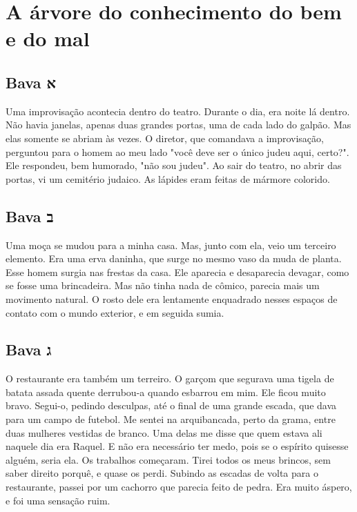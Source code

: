 \part{A árvore do conhecimento do bem e do mal}

\chapter*{Bava א\smallskip{}}

Uma improvisação acontecia dentro do teatro. Durante o dia, era noite lá dentro. Não havia janelas, apenas duas grandes portas, uma de cada lado do galpão. Mas elas somente se abriam às vezes. O diretor, que comandava a improvisação, perguntou para o homem ao meu lado "você deve ser o único judeu aqui, certo?". Ele respondeu, bem humorado, "não sou judeu". Ao sair do teatro, no abrir das portas, vi um cemitério judaico. As lápides eram feitas de mármore colorido.

\chapter*{Bava ב\smallskip{}}

Uma moça se mudou para a minha casa. Mas, junto com ela, veio um terceiro elemento. Era uma erva daninha, que surge no mesmo vaso da muda de planta. Esse homem surgia nas frestas da casa. Ele aparecia e desaparecia devagar, como se fosse uma brincadeira. Mas não tinha nada de cômico, parecia mais um movimento natural. O rosto dele era lentamente enquadrado nesses espaços de contato com o mundo exterior, e em seguida sumia.

\chapter*{Bava ג\smallskip{}}

O restaurante era também um terreiro. O garçom que segurava uma tigela de batata assada quente derrubou-a quando esbarrou em mim. Ele ficou muito bravo. Segui-o, pedindo desculpas, até o final de uma grande escada, que dava para um campo de futebol. Me sentei na arquibancada, perto da grama, entre duas mulheres vestidas de branco. Uma delas me disse que quem estava ali naquele dia era Raquel. E não era necessário ter medo, pois se o espírito quisesse alguém, seria ela. Os trabalhos começaram. Tirei todos os meus brincos, sem saber direito porquê, e quase os perdi. Subindo as escadas de volta para o restaurante, passei por um cachorro que parecia feito de pedra. Era muito áspero, e foi uma sensação ruim.

